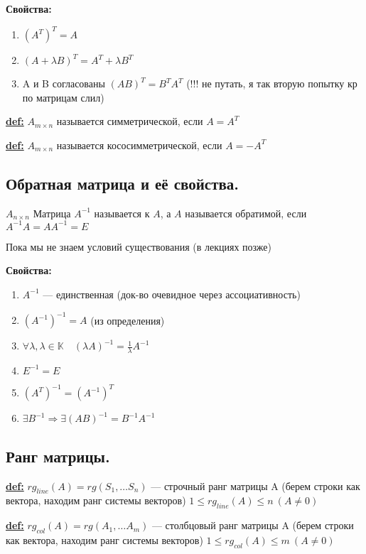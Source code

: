 \textbf{Свойства:}
\begin{enumerate}
    \item $ (A^T)^T = A $
    \item $ (A+\lambda B)^T = A^T+\lambda B^T $
    \item A и B согласованы $ (AB)^T = B^T A^T $ (!!! не путать, я так вторую попытку кр по матрицам слил)
\end{enumerate}

\textbf{\underline{def:}} $ A_{m \times n} $ называется симметрической, если $ A = A^T$

\textbf{\underline{def:}} $ A_{m \times n} $ называется кососимметрической, если $ A = -A^T$
\subsection{Обратная матрица и её свойства.}

\( A_{n \times n}\)
Матрица $ A^{-1} $ называется  к $ A $, а $ A $ называется обратимой, если $ A^{-1}A = AA^{-1} = E $

Пока мы не знаем условий существования (в лекциях позже)

\textbf{Свойства:}
\begin{enumerate}
    \item $ A^{-1} $ --- единственная (док-во очевидное через ассоциативность)
    \item $ (A^{-1})^{-1} = A $ (из определения)
    \item $ \forall \lambda, \lambda \in \mathbb{K} \quad (\lambda A)^{-1} = \frac{1}{\lambda}A^{-1}$
    \item $ E^{-1} = E $
    \item $ (A^T)^{-1} = (A^{-1})^T $
    \item $ \exists B^{-1} \Rightarrow \exists (AB)^{-1} = B^{-1}A^{-1}$
\end{enumerate}

\subsection{Ранг матрицы.}
\textbf{\underline{def:}} $ rg_{line}(A) = rg(S_1, \ldots S_n)$ --- строчный ранг матрицы A (берем строки как вектора, находим ранг системы векторов) $ 1 \leq rg_{line}(A) \leq n \  (A \neq 0)$

\textbf{\underline{def:}} $ rg_{col}(A) = rg(A_1, \ldots A_m)$ --- столбцовый ранг матрицы A (берем строки как вектора, находим ранг системы векторов) $ 1 \leq rg_{col}(A) \leq m \  (A \neq 0)$

